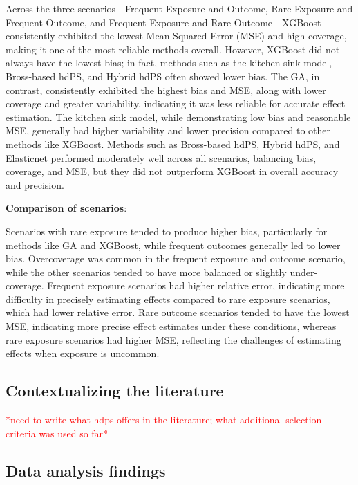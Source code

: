 \documentclass[sn-vancouver,Numbered,lineno,pdflatex]{sn-jnl}
\begin{document}
Across the three scenarios---Frequent Exposure and Outcome, Rare
Exposure and Frequent Outcome, and Frequent Exposure and Rare
Outcome---XGBoost consistently exhibited the lowest Mean Squared Error
(MSE) and high coverage, making it one of the most reliable methods
overall. However, XGBoost did not always have the lowest bias; in fact,
methods such as the kitchen sink model, Bross-based hdPS, and Hybrid
hdPS often showed lower bias. The GA, in contrast, consistently
exhibited the highest bias and MSE, along with lower coverage and
greater variability, indicating it was less reliable for accurate effect
estimation. The kitchen sink model, while demonstrating low bias and
reasonable MSE, generally had higher variability and lower precision
compared to other methods like XGBoost. Methods such as Bross-based
hdPS, Hybrid hdPS, and Elasticnet performed moderately well across all
scenarios, balancing bias, coverage, and MSE, but they did not
outperform XGBoost in overall accuracy and precision.

\textbf{Comparison of scenarios}:

Scenarios with rare exposure tended to produce higher bias, particularly
for methods like GA and XGBoost, while frequent outcomes generally led
to lower bias. Overcoverage was common in the frequent exposure and
outcome scenario, while the other scenarios tended to have more balanced
or slightly under-coverage. Frequent exposure scenarios had higher
relative error, indicating more difficulty in precisely estimating
effects compared to rare exposure scenarios, which had lower relative
error. Rare outcome scenarios tended to have the lowest MSE, indicating
more precise effect estimates under these conditions, whereas rare
exposure scenarios had higher MSE, reflecting the challenges of
estimating effects when exposure is uncommon.

\subsection{Contextualizing the
literature}\label{contextualizing-the-literature}

\textcolor{red}{*need to write what hdps offers in the literature; what additional selection criteria was used so far*}

\subsection{Data analysis findings}\label{data-analysis-findings}
\end{document}
